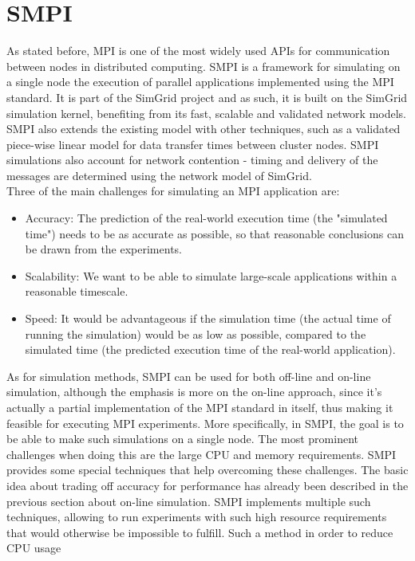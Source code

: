 \section{SMPI}
As stated before, MPI is one of the most widely used APIs for
communication between nodes in distributed computing. SMPI is a
framework for simulating on a single node the execution of parallel
applications implemented using the MPI standard. It is part of the
SimGrid project and as such, it is built on the SimGrid simulation
kernel, benefiting from its fast, scalable and validated network
models. SMPI also extends the existing model with other techniques,
such as a validated piece-wise linear model for data transfer times
between cluster nodes. SMPI simulations also account for network
contention - timing and delivery of the messages are determined using
the network model of SimGrid.\cite{csgscq11}\\
Three of the main challenges for simulating an MPI application are:
\begin{itemize}
\item Accuracy: The prediction of the real-world execution time (the
  "simulated time") needs to be as accurate as possible, so that
  reasonable conclusions can be drawn from the experiments.
\item Scalability: We want to be able to simulate large-scale
  applications within a reasonable timescale.
\item Speed: It would be advantageous if the simulation time (the
  actual time of running the simulation) would be as low as possible,
  compared to the simulated time (the predicted execution time of the
  real-world application).
\end{itemize}
As for simulation methods, SMPI can be used for both off-line and
on-line simulation, although the emphasis is more on the on-line
approach, since it's actually a partial implementation of the MPI
standard in itself, thus making it feasible for executing MPI
experiments. More specifically, in SMPI, the goal is to be able to
make such simulations on a single node. The most prominent challenges
when doing this are the large CPU and memory requirements. SMPI
provides some special techniques that help overcoming these
challenges. The basic idea about trading off accuracy for performance
has already been described in the previous section about on-line
simulation. SMPI implements multiple such techniques, allowing to run
experiments with such high resource requirements that would otherwise
be impossible to fulfill. Such a method in order to reduce CPU usage
